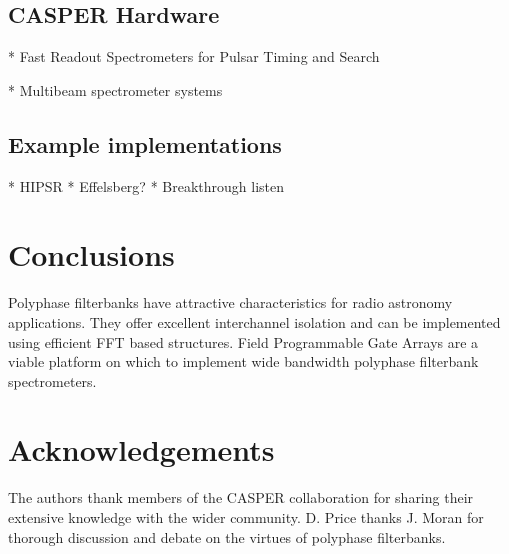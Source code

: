 \documentclass{ws-rv961x669}
\begin{document}
\subsection{CASPER Hardware}

* Fast Readout Spectrometers for Pulsar Timing and Search

* Multibeam spectrometer systems


\subsection{Example implementations}

* HIPSR
* Effelsberg?
* Breakthrough listen

\section{Conclusions}

Polyphase filterbanks have attractive characteristics for radio astronomy applications. They offer excellent interchannel isolation and can be implemented using efficient FFT based structures. Field Programmable Gate Arrays are a viable platform on which to implement wide bandwidth polyphase filterbank spectrometers.

\section{Acknowledgements}

The authors thank members of the CASPER collaboration for sharing their extensive knowledge with the wider community. D. Price thanks J. Moran for thorough discussion and debate on the virtues of polyphase filterbanks. 



\end{document}
